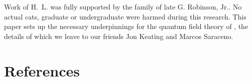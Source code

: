 \documentclass[12pt]{iopart}
\begin{document}
\ack
Work of H.~L. was fully supported by the family of late G. Robinson,
Jr..
No actual cats, graduate or undergraduate %
were harmed during this research. This paper sets up the necessary
underpinnings for the quantum field theory of \catlatt, the details of
which we leave to our %
friends Jon Keating and Marcos Saraceno.



%

    \ifsubmission
\section*{References}

    \else
\printbibliography[
heading=bibintoc,
title={References}
				  ] %
    \fi


    \ifboyscout
%
%

    \clearpage
    
    
    \fi %
\end{document}
